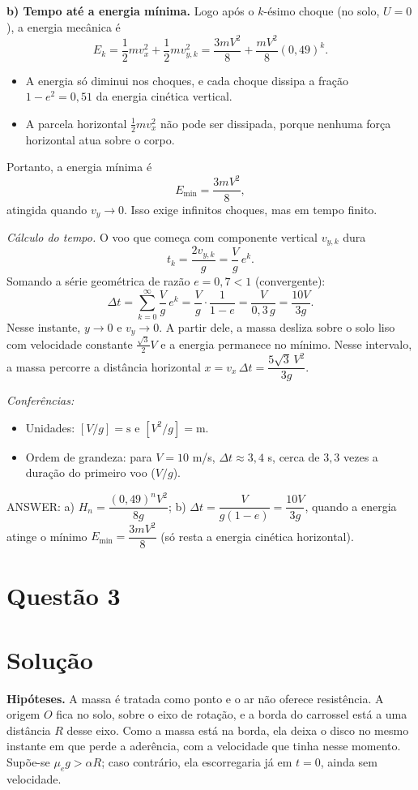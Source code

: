 \documentclass{article}%
\begin{document}
\textbf{b) Tempo até a energia mínima.} Logo após o $k$-ésimo choque (no solo, $U=0$), a energia mecânica é
\[
E_k=\frac{1}{2}m v_x^2+\frac{1}{2}m v_{y,k}^2=\frac{3mV^2}{8}+\frac{mV^2}{8}(0{,}49)^k .
\]
\begin{itemize}
\item A energia só diminui nos choques, e cada choque dissipa a fração $1-e^2=0{,}51$ da energia cinética vertical.
\item A parcela horizontal $\tfrac{1}{2}mv_x^2$ não pode ser dissipada, porque nenhuma força horizontal atua sobre o corpo.
\end{itemize}
Portanto, a energia mínima é
\[
E_{\min}=\frac{3mV^2}{8},
\]
atingida quando $v_y\to 0$. Isso exige infinitos choques, mas em tempo finito.

\emph{Cálculo do tempo.} O voo que começa com componente vertical $v_{y,k}$ dura
\[
t_k=\frac{2v_{y,k}}{g}=\frac{V}{g}\,e^{k}.
\]
Somando a série geométrica de razão $e=0{,}7<1$ (convergente):
\[
\Delta t=\sum_{k=0}^{\infty}\frac{V}{g}\,e^{k}=\frac{V}{g}\cdot\frac{1}{1-e}=\frac{V}{0{,}3\,g}=\frac{10V}{3g}.
\]
Nesse instante, $y\to 0$ e $v_y\to 0$. A partir dele, a massa desliza sobre o solo liso com velocidade constante $\frac{\sqrt{3}}{2}V$ e a energia permanece no mínimo. Nesse intervalo, a massa percorre a distância horizontal $x=v_x\,\Delta t=\dfrac{5\sqrt{3}\,V^2}{3g}$.

\emph{Conferências:}
\begin{itemize}
\item Unidades: $[V/g]=\mathrm{s}$ e $[V^2/g]=\mathrm{m}$.
\item Ordem de grandeza: para $V=10$ m/s, $\Delta t\approx 3{,}4$ s, cerca de $3{,}3$ vezes a duração do primeiro voo ($V/g$).
\end{itemize}

ANSWER: a) $H_n=\dfrac{(0{,}49)^n V^2}{8g}$; b) $\Delta t=\dfrac{V}{g(1-e)}=\dfrac{10V}{3g}$, quando a energia atinge o mínimo $E_{\min}=\dfrac{3mV^2}{8}$ (só resta a energia cinética horizontal).%
\newpage%
\section*{Questão 3}

\section*{Solução}

\textbf{Hipóteses.} A massa é tratada como ponto e o ar não oferece resistência. A origem $O$ fica no solo, sobre o eixo de rotação, e a borda do carrossel está a uma distância $R$ desse eixo. Como a massa está na borda, ela deixa o disco no mesmo instante em que perde a aderência, com a velocidade que tinha nesse momento. Supõe-se $\mu_e g > \alpha R$; caso contrário, ela escorregaria já em $t=0$, ainda sem velocidade.
\end{document}
